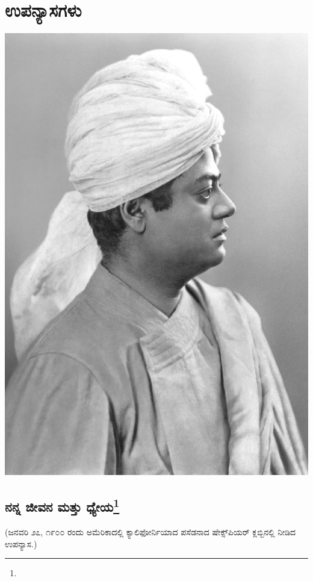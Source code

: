 

\part{ಉಪನ್ಯಾಸಗಳು}

\begin{center}
\thispagestyle{empty}
\includegraphics{images/vivekananda.jpg}
\end{center}

\chapter[ನನ್ನ ಜೀವನ ಮತ್ತು ಧ್ಯೇಯ]{ನನ್ನ ಜೀವನ ಮತ್ತು ಧ್ಯೇಯ\protect\footnote{}}

\begin{center}
(ಜನವರಿ ೨೭, ೧೯೦೦ ರಂದು ಅಮೆರಿಕಾದಲ್ಲಿ ಕ್ಯಾಲಿಫೋರ್ನಿಯಾದ ಪಸೆಡನಾದ ಷೇಕ್ಸ್‌ಪಿಯರ್ ಕ್ಲಬ್ಬಿನಲ್ಲಿ ನೀಡಿದ ಉಪನ್ಯಾಸ.)
\end{center}


